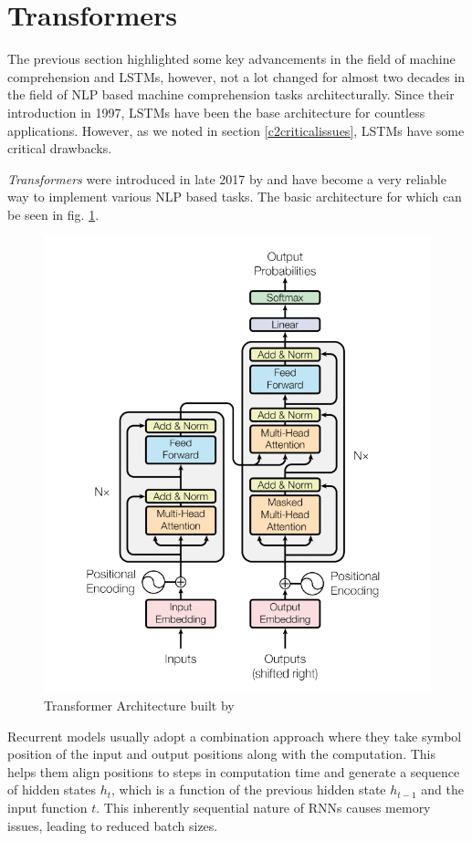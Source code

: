 \documentclass[a4paper,12pt]{report}
\begin{document}
	    \section{Transformers}\label{23}

	    	The previous section highlighted some key advancements in the field of machine comprehension and LSTMs, however, not a lot changed for almost two decades in the field of NLP based machine comprehension tasks architecturally. Since their introduction in 1997, LSTMs \citep{lstmoriginal} have been the base architecture for countless applications. However, as we noted in section \ref{c2criticalissues}, LSTMs have some critical drawbacks.

			\textit{Transformers} were introduced in late 2017 by \citep{atayl} and have become a very reliable way to implement various NLP based tasks. The basic architecture for which can be seen in fig. \ref{transformerArchitecture}.
			\begin{figure}[h!]
				\centering
				\includegraphics[scale=0.4]{../images/transformer.png}
				\caption{Transformer Architecture built by \citep{atayl}}\label{transformerArchitecture}
			\end{figure}
	        Recurrent models usually adopt a combination approach where they take symbol position of the input and output positions along with the computation. This helps them align positions to steps in computation time and generate a sequence of hidden states $ h_{t} $, which is a function of the previous hidden state $ h_{t-1}$ and the input function $ t $.  This inherently sequential nature of RNNs causes memory issues, leading to reduced batch sizes.
\end{document}

